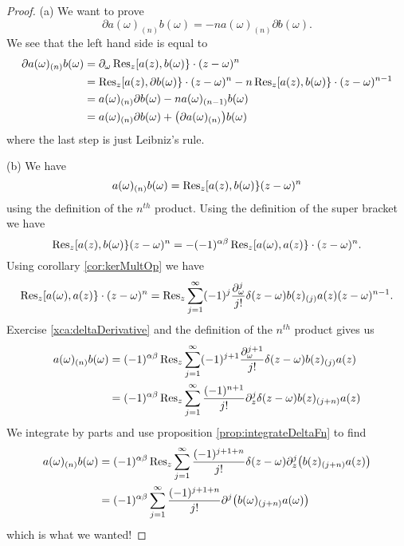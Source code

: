 \begin{proof}
(a)
We want to prove 
\begin{equation}
\partial a(\omega)_{(n)}b(\omega)=-na(\omega)_{(n)}\partial b(\omega).
\end{equation}
We see that the left hand side is equal to
\begin{subequations}
\begin{align}
\partial a(\omega)_{(n)}b(\omega)
&=\partial_{\omega}\Res[z]{\superb{a(z)}{b(\omega)}\cdot(z-\omega)^{n}}\\
&=\Res[z]{\superb{a(z)}{\partial b(\omega)}\cdot(z-\omega)^{n}}
-n\Res[z]{\superb{a(z)}{b(\omega)}\cdot(z-\omega)^{n-1}}\\
&=a(\omega)_{(n)}\partial b(\omega)-na(\omega)_{(n-1)}b(\omega)\\
&=a(\omega)_{(n)}\partial b(\omega)+\bigl(\partial
a(\omega)_{(n)}\bigr)b(\omega)
\end{align}
\end{subequations}
where the last step is just Leibniz's rule.

(b) We have
\begin{equation}
a(\omega)_{(n)}b(\omega)
= \Res[z]{\superb{a(z)}{b(\omega)}(z-\omega)^{n}}
\end{equation}
using the definition of the $n^{th}$ product. Using the definition of
the super bracket we have
\begin{equation}
\Res[z]{\superb{a(z)}{b(\omega)}(z-\omega)^{n}}
=-(-1)^{\alpha\beta}\Res[z]{\superb{a(\omega)}{a(z)}\cdot(z-\omega)^{n}}.
\end{equation}
Using corollary \ref{cor:kerMultOp} we have
\begin{equation}
\Res[z]{\superb{a(\omega)}{a(z)}\cdot(z-\omega)^{n}}
=\Res[z]{\sum^{\infty}_{j=1}(-1)^{j}
\frac{\partial_{\omega}^{j}}{j!}\delta(z-\omega)b(z)_{(j)}a(z)(z-\omega)^{n-1}}.
\end{equation}
Exercise \ref{xca:deltaDerivative} and the definition of the $n^{th}$
product gives us
\begin{subequations}
\begin{align}
a(\omega)_{(n)}b(\omega)&=(-1)^{\alpha\beta}
\Res[z]{\sum^{\infty}_{j=1}(-1)^{j+1}\frac{\partial_{\omega}^{j+1}}{j!}\delta(z-\omega)b(z)_{(j)}a(z)}\\
&=(-1)^{\alpha\beta}\Res[z]{\sum^{\infty}_{j=1}
\frac{(-1)^{n+1}}{j!}\partial_{z}^{j}\delta(z-\omega)b(z)_{(j+n)}a(z)}
\end{align}
\end{subequations}
We integrate by parts and use proposition \ref{prop:integrateDeltaFn} to
find
\begin{subequations}
\begin{align}
a(\omega)_{(n)}b(\omega)
&=(-1)^{\alpha\beta}\Res[z]{\sum^{\infty}_{j=1}\frac{(-1)^{j+1+n}}{j!}\delta(z-\omega)\partial_{z}^{j}\bigl(b(z)_{(j+n)}a(z)\bigr)}\\
&=(-1)^{\alpha\beta}
\sum^{\infty}_{j=1}\frac{(-1)^{j+1+n}}{j!}\partial^{j}\bigl(b(\omega)_{(j+n)}a(\omega)\bigr)
\end{align}
\end{subequations}
which is what we wanted!


\end{proof}
